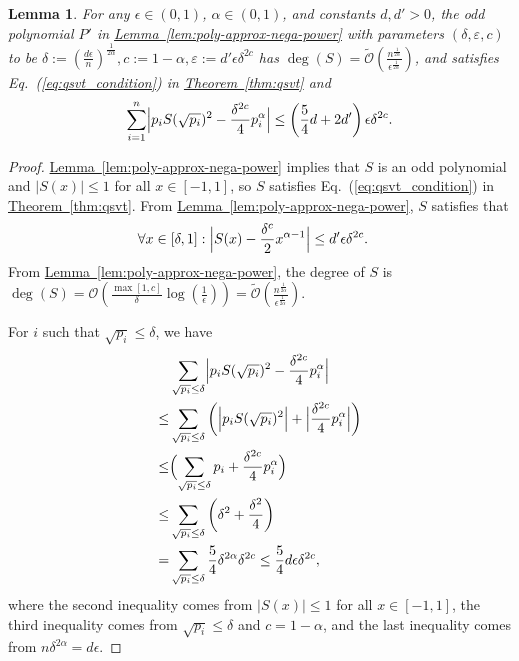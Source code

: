 \documentclass[journal]{IEEEtran}
\newtheorem{lemma}{Lemma}
\newcommand{\eq}[1]{Eq.~(\ref{eq:#1})}
\newcommand{\thm}[1]{\hyperref[thm:#1]{Theorem~\ref*{thm:#1}}}
\newcommand{\lem}[1]{\hyperref[lem:#1]{Lemma~\ref*{lem:#1}}}
\begin{document}
\begin{lemma}
\label{lem:small_alpha_approx}
  For any $\epsilon\in(0,1)$, $\alpha \in (0,1)$, and constants $d,d' > 0$, the odd polynomial $P'$ in \lem{poly-approx-nega-power} with parameters $(\delta, \varepsilon, c)$ to be $\delta := (\frac{d\epsilon}{n})^{{\frac{1}{2\alpha}}},c := 1-\alpha,\varepsilon := d'\epsilon\delta^{2c}$ has $\deg(S) = \widetilde{\mathcal{O}}\left(\frac{n^{\frac{1}{2\alpha}}}{\epsilon^{\frac{1}{2\alpha}}}\right)$, and satisfies \eq{qsvt_condition} in \thm{qsvt} and
  \begin{align}
      \sum_{i=1}^n \Bigl|p_iS(\sqrt{p_i})^2-\frac{\delta^{2c}}{4}p_i^{\alpha}\Bigr|\le \left(\frac{5}{4}d + 2d'\right)\epsilon \delta^{2c}.
  \end{align}
\end{lemma}
\begin{proof}
    \lem{poly-approx-nega-power} implies that $S$ is an odd polynomial and $|S(x)| \le 1$ for all $x\in[-1,1]$, so $S$ satisfies \eq{qsvt_condition} in \thm{qsvt}.
    From \lem{poly-approx-nega-power}, $S$ satisfies that
    \begin{align}
    \label{eq:approximation_small_alpha}
        &\forall x\in \left[\delta,1\right]: \Bigl|S(x)-\frac{\delta^{c}}{2}x^{\alpha-1}\Bigr| \le d'\epsilon\delta^{2c}.
    \end{align}
    From \lem{poly-approx-nega-power}, the degree of $S$ is $\deg(S) = \mathcal{O}\left(\frac{\max[1,c]}{\delta}\log(\frac{1}{\epsilon})\right) = \widetilde{\mathcal{O}}\left(\frac{n^{\frac{1}{2\alpha}}}{\epsilon^{\frac{1}{2\alpha}}}\right)$.


  For $i$ such that $\sqrt{p_i} \le \delta$, we have
    \begin{align}
      &\sum_{\sqrt{p_i} \le \delta} \Bigl|p_iS(\sqrt{p_i})^2-\frac{\delta^{2c}}{4}p_i^{\alpha}\Bigr| \nonumber \\
      \le & \sum_{\sqrt{p_i} \le \delta} \left(\Bigl|p_iS(\sqrt{p_i})^2\Bigr| + \Bigl|\frac{\delta^{2c}}{4}p_i^{\alpha}\Bigr|\right) \nonumber\\
      \le & \Bigl(\sum_{\sqrt{p_i} \le \delta}p_i + \frac{\delta^{2c}}{4}p_i^{\alpha}\Bigr)                \nonumber\\
      \le & \sum_{\sqrt{p_i} \le \delta} \left(\delta^{2} + \frac{\delta^{2}}{4}  \right)                   \nonumber \\
      = & \sum_{\sqrt{p_i} \le \delta} \frac{5}{4}\delta^{2\alpha}\delta^{2c} 
      \le  \frac{5}{4}d\epsilon\delta^{2c},
    \end{align}
    \label{eq:little_alpha_little_delta}
  where the second inequality comes from $|S(x)|\le 1$ for all $x\in[-1,1]$, the third inequality comes from $\sqrt{p_i} \le \delta$ and $c = 1-\alpha$,
  and the last inequality comes from $n \delta^{2\alpha} = d\epsilon$.


\end{proof}
\end{document}
